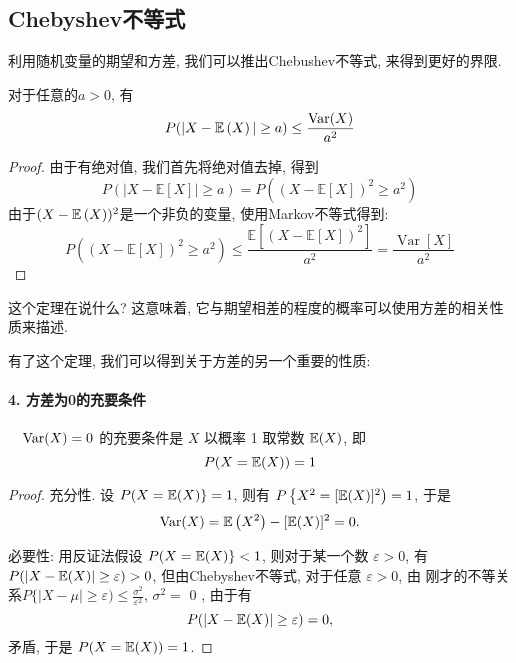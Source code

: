 \subsection{Chebyshev不等式}

利用随机变量的期望和方差, 我们可以推出Chebushev不等式, 来得到更好的界限. 

\begin{theorem}
    对于任意的$a>0$, 有
    $$
    P(|X-\mathbb E\left(X\right)|\geq a)\leq \frac{\operatorname{Var}(X)}{a^2}
    $$
\end{theorem}

\begin{proof}
    由于有绝对值, 我们首先将绝对值去掉, 得到
    $$
P(|X-\mathbb{E}[X]| \geq a)=P\left((X-\mathbb{E}[X])^2 \geq a^2\right)
$$
由于$(X-\mathbb E\left(X\right))^2$是一个非负的变量, 使用Markov不等式得到: 
$$P\left((X-\mathbb{E}[X])^2 \geq a^2\right) \leq \frac{\mathbb{E}\left[(X-\mathbb{E}[X])^2\right]}{a^2}=\frac{\operatorname{Var}[X]}{a^2}$$


\end{proof}

这个定理在说什么? 这意味着, 它与期望相差的程度的概率可以使用方差的相关性质来描述. 

有了这个定理, 我们可以得到关于方差的另一个重要的性质: 

\paragraph{4. 方差为0的充要条件} $\quad \operatorname{Var}(X)=0$ 的充要条件是 $X$ 以概率 1 取常数 $\mathbb E(X)$, 即
$$
P(X=\mathbb E(X))=1
$$

\begin{proof}
    充分性. 设 $P(X=\mathbb E(X)\}=1$, 则有 $P\left\{X^2=[\mathbb E(X)]^2\right)=1$, 于是
    $$
    \operatorname{Var}(X)=\mathbb E\left(X^2\right)-[\mathbb E(X)]^2=0 .
    $$
    
    必要性: 用反证法假设 $P(X=\mathbb E(X)\}<1$, 则对于某一个数 $\varepsilon>0$, 有 $P(|X-\mathbb E(X)| \geq \varepsilon)>0$, 但由Chebyshev不等式, 对于任意 $\varepsilon>0$, 由 刚才的不等关系$P\{|X-\mu| \geq \varepsilon) \leq \frac{\sigma^2}{\varepsilon^2}$, $\sigma^2=$ 0 , 由于有
    $$
    P(|X-\mathbb E(X)| \geq \varepsilon)=0,
    $$
    矛盾, 于是 $P(X=\mathbb E(X))=1$.
\end{proof}